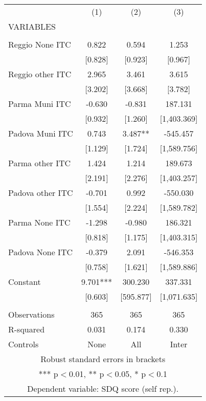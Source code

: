 \begin{tabular}{lccc} \hline
 & (1) & (2) & (3) \\
VARIABLES &  &  &  \\ \hline
 &  &  &  \\
Reggio None ITC & 0.822 & 0.594 & 1.253 \\
 & [0.828] & [0.923] & [0.967] \\
Reggio other ITC & 2.965 & 3.461 & 3.615 \\
 & [3.202] & [3.668] & [3.782] \\
Parma Muni ITC & -0.630 & -0.831 & 187.131 \\
 & [0.932] & [1.260] & [1,403.369] \\
Padova Muni ITC & 0.743 & 3.487** & -545.457 \\
 & [1.129] & [1.724] & [1,589.756] \\
Parma other ITC & 1.424 & 1.214 & 189.673 \\
 & [2.191] & [2.276] & [1,403.257] \\
Padova other ITC & -0.701 & 0.992 & -550.030 \\
 & [1.554] & [2.224] & [1,589.782] \\
Parma None ITC & -1.298 & -0.980 & 186.321 \\
 & [0.818] & [1.175] & [1,403.315] \\
Padova None ITC & -0.379 & 2.091 & -546.353 \\
 & [0.758] & [1.621] & [1,589.886] \\
Constant & 9.701*** & 300.230 & 337.331 \\
 & [0.603] & [595.877] & [1,071.635] \\
 &  &  &  \\
Observations & 365 & 365 & 365 \\
R-squared & 0.031 & 0.174 & 0.330 \\
 Controls & None & All & Inter \\ \hline
\multicolumn{4}{c}{ Robust standard errors in brackets} \\
\multicolumn{4}{c}{ *** p$<$0.01, ** p$<$0.05, * p$<$0.1} \\
\multicolumn{4}{c}{ Dependent variable: SDQ score (self rep.).} \\
\end{tabular}
